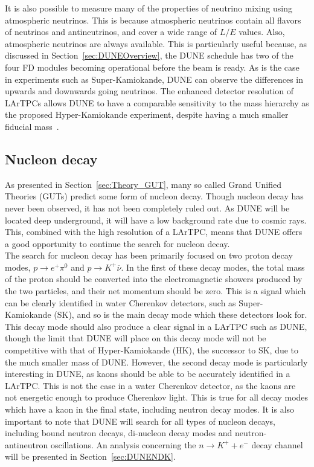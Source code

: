 It is also possible to measure many of the properties of neutrino mixing using atmospheric neutrinos. This is because atmospheric neutrinos contain all flavors of neutrinos and antineutrinos, and cover a wide range of $L/E$ values. Also, atmospheric neutrinos are always available. This is particularly useful because, as discussed in Section~\ref{sec:DUNEOverview}, the DUNE schedule has two of the four FD modules becoming operational before the beam is ready. As is the case in experiments such as Super-Kamiokande, DUNE can observe the differences in upwards and downwards going neutrinos. The enhanced detector resolution of LArTPCs allows DUNE to have a comparable sensitivity to the mass hierarchy as the proposed Hyper-Kamiokande experiment, despite having a much smaller fiducial mass~\citep{DUNECDR_V2}.  

\subsection{Nucleon decay} \label{sec:DUNE_NDK}%
As presented in Section~\ref{sec:Theory_GUT}, many so called Grand Unified Theories (GUTs) predict some form of nucleon decay. Though nucleon decay has never been observed, it has not been completely ruled out. As DUNE will be located deep underground, it will have a low background rate due to cosmic rays. This, combined with the high resolution of a LArTPC, means that DUNE offers a good opportunity to continue the search for nucleon decay. \\

The search for nucleon decay has been primarily focused on two proton decay modes, $p \rightarrow e^{+} \pi^{0}$ and $p \rightarrow K^{+} \overline{\nu}$. In the first of these decay modes, the total mass of the proton should be converted into the electromagnetic showers produced by the two particles, and their net momentum should be zero. This is a signal which can be clearly identified in water Cherenkov detectors, such as Super-Kamiokande (SK), and so is the main decay mode which these detectors look for. This decay mode should also produce a clear signal in a LArTPC such as DUNE, though the limit that DUNE will place on this decay mode will not be competitive with that of Hyper-Kamiokande (HK), the successor to SK, due to the much smaller mass of DUNE. However, the second decay mode is particularly interesting in DUNE, as kaons should be able to be accurately identified in a LArTPC. This is not the case in a water Cherenkov detector, as the kaons are not energetic enough to produce Cherenkov light. This is true for all decay modes which have a kaon in the final state, including neutron decay modes. It is also important to note that DUNE will search for all types of nucleon decays, including bound neutron decays, di-nucleon decay modes and neutron-antineutron oscillations. An analysis concerning the $n \rightarrow K^{+} + e^{-}$ decay channel will be presented in Section~\ref{sec:DUNENDK}. \\

